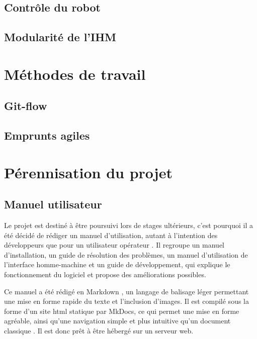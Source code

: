 		\subsection{Contrôle du robot}
		
			\lipsum[1]
			
		\subsection{Modularité de l'IHM}
		
			\lipsum[2]
			
	\section{Méthodes de travail}

		\subsection{Git-flow}
		
			\lipsum[3]
			
		\subsection{Emprunts agiles}
		
			\lipsum[4]
			

	\section{Pérennisation du projet}
	
		\subsection{Manuel utilisateur}
		
			Le projet est destiné à être poursuivi lors de stages ultérieurs, c'est pourquoi il a été décidé de rédiger un manuel d'utilisation, autant à l'intention des développeurs que pour un utilisateur \og opérateur \fg{}. Il regroupe un manuel d'installation, un guide de résolution des problèmes, un manuel d'utilisation de l'interface homme-machine et un guide de développement, qui explique le fonctionnement du logiciel et propose des améliorations possibles.
			\par
			Ce manuel a été rédigé en Markdown \cite{markdown}, un langage de balisage léger permettant une mise en forme rapide du texte et l'inclusion d'images. Il est compilé sous la forme d'un site html statique par MkDocs\cite{mkdocs}, ce qui permet une mise en forme agréable, ainsi qu'une navigation simple et plus intuitive qu'un document \og classique \fg{}. Il est donc prêt à être hébergé sur un serveur web.
			
